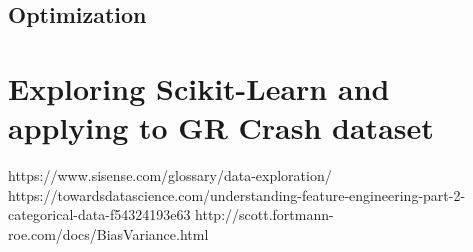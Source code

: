 \documentclass[notes]{beamer}
\begin{document}
\subsection{Optimization}

\section{Exploring Scikit-Learn and applying to GR Crash dataset}
\frame{\tableofcontents[currentsection]}


\begin{frame}
	\begin{thebibliography}{9}
		 https://www.sisense.com/glossary/data-exploration/
		https://towardsdatascience.com/understanding-feature-engineering-part-2-categorical-data-f54324193e63
		http://scott.fortmann-roe.com/docs/BiasVariance.html
	\end{thebibliography}
\end{frame}
\end{document}
